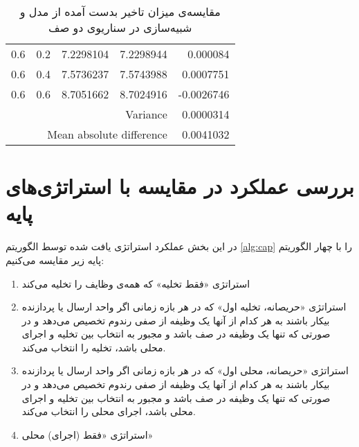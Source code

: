 \begin{table}[]
\begin{latin}
\begin{tabular}{@{}rrrrr@{}}
			0.6                      & 0.2                      & 7.2298104                                  & 7.2298944                                     & 0.000084                  \\
			0.6                      & 0.4                      & 7.5736237                                  & 7.5743988                                     & 0.0007751                 \\
			0.6                      & 0.6                      & 8.7051662                                  & 8.7024916                                     & -0.0026746                \\ \midrule
			\multicolumn{4}{r}{Variance}                                                                                                                     & 0.0000314                 \\
			\multicolumn{4}{r}{Mean absolute difference}                                                                                                     & 0.0041032                 \\ \bottomrule
		\end{tabular}
	\end{latin}
	\caption{مقایسه‌ی میزان تاخیر بدست آمده از مدل و شبیه‌سازی در سناریوی دو صف}
	\label{table:scenario2}
\end{table}
\section{بررسی عملکرد در مقایسه با استراتژی‌های پایه}
در این بخش عملکرد استراتژی یافت شده توسط الگوریتم \ref{alg:cap} را با چهار الگوریتم پایه زیر مقایسه می‌کنیم:
\begin{enumerate}
	\item استراتژی «فقط تخلیه» که همه‌ی وظایف را تخلیه می‌کند
	\item استراتژی «حریصانه، تخلیه اول» که در هر بازه زمانی اگر واحد ارسال یا پردازنده بیکار باشند به هر کدام از آنها یک وظیفه از صفی رندوم تخصیص می‌دهد و در صورتی که تنها یک وظیفه در صف باشد و مجبور به انتخاب بین تخلیه و اجرای محلی باشد، تخلیه را انتخاب می‌کند.
	\item استراتژی «حریصانه، محلی اول» که در هر بازه زمانی اگر واحد ارسال یا پردازنده بیکار باشند به هر کدام از آنها یک وظیفه از صفی رندوم تخصیص می‌دهد و در صورتی که تنها یک وظیفه در صف باشد و مجبور به انتخاب بین تخلیه و اجرای محلی باشد، اجرای محلی را انتخاب می‌کند.
	\item استراتژی «فقط (اجرای) محلی»
\end{enumerate}
